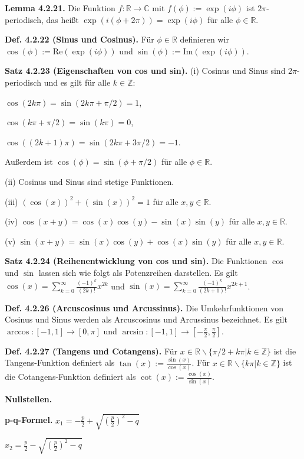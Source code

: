 \textbf{Lemma 4.2.21.} Die Funktion $f:\mathbb R \rightarrow \mathbb C$ mit $f(\phi) := \exp (i\phi)$ ist $2\pi$-periodisch, das heißt $\exp (i(\phi +2\pi)) = \exp(i\phi)$ für alle $\phi \in \mathbb R$.

\textbf{Def. 4.2.22 (Sinus und Cosinus).} Für $\phi \in \mathbb R$ definieren wir $\cos(\phi) := \text{Re}(\exp(i\phi))$ und $\sin(\phi) := \text{Im}(\exp(i\phi))$.

\textbf{Satz 4.2.23 (Eigenschaften von cos und sin).} (i) Cosinus und Sinus sind $2\pi$-periodisch und es gilt für alle $k \in \mathbb Z$:

$\cos (2k\pi) = \sin (2k\pi + \pi / 2)= 1$,

$\cos (k\pi+ \pi /2) = \sin(k\pi) = 0$,

$\cos ((2k+1)\pi) = \sin (2k\pi+3\pi/2) = -1$.

Außerdem ist $\cos (\phi) = \sin(\phi + \pi /2)$ für alle $\phi \in \mathbb R$.

(ii) Cosinus und Sinus sind  stetige Funktionen.

(iii) $(\cos(x))^2 + (\sin (x))^2 = 1$ für alle $x,y \in \mathbb R$.

(iv) $\cos (x+y) = \cos (x) \cos (y) - \sin (x) \sin (y)$ für alle $x,y \in \mathbb R$.

(v) $\sin (x+y) = \sin (x) \cos(y) + \cos (x) \sin (y)$ für alle $x,y \in \mathbb R$.

\textbf{Satz 4.2.24 (Reihenentwicklung von cos und sin).} Die Funktionen $\cos$ und $\sin$ lassen sich wie folgt als Potenzreihen darstellen. Es gilt $\cos (x) = \sum_{k=0}^\infty \frac{(-1)^k}{(2k)!}x^{2k}$ und $\sin (x) = \sum_{k=0}^\infty \frac{(-1)^k}{(2k+1)!}x^{2k+1}$.

\textbf{Def. 4.2.26 (Arcuscosinus und Arcussinus).} Die Umkehrfunktionen von Cosinus und Sinus werden als Arcuscosinus und Arcussinus bezeichnet. Es gilt $\arccos\colon[-1,1]\to[0,\pi]$ und $\arcsin\colon[-1,1]\to \left[-\frac{\pi}{2},\frac{\pi}{2} \right]$.  

\textbf{Def. 4.2.27 (Tangens und Cotangens).} Für $x\in \mathbb R \backslash \{ \pi /2 + k \pi \vert k \in \mathbb Z \}$ ist die Tangens-Funktion definiert als $\tan(x) := \frac{\sin(x)}{\cos(x)}$. Für $x \in \mathbb R \backslash \{ k\pi \vert k \in \mathbb Z \}$ ist die Cotangens-Funktion definiert als $\cot(x) := \frac{\cos(x)}{\sin(x)}$.

\textbf{Nullstellen.}

\textbf{p-q-Formel.} $x_{1} = - \frac{p}{2}+\sqrt{\left(\frac{p}2\right)^2 - q}$

$x_{2} =  \frac{p}{2}-\sqrt{\left(\frac{p}2\right)^2 - q}$

